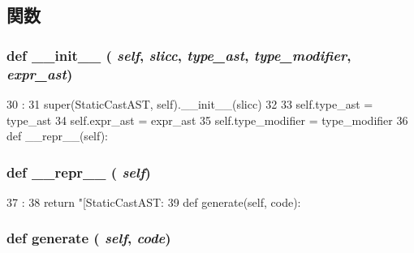 \subsection{関数}
\hypertarget{classslicc_1_1ast_1_1StaticCastAST_1_1StaticCastAST_ac775ee34451fdfa742b318538164070e}{
\subsubsection[{\_\-\_\-init\_\-\_\-}]{\setlength{\rightskip}{0pt plus 5cm}def \_\-\_\-init\_\-\_\- ( {\em self}, \/   {\em slicc}, \/   {\em type\_\-ast}, \/   {\em type\_\-modifier}, \/   {\em expr\_\-ast})}}
\label{classslicc_1_1ast_1_1StaticCastAST_1_1StaticCastAST_ac775ee34451fdfa742b318538164070e}



\begin{DoxyCode}
30                                                                 :
31         super(StaticCastAST, self).__init__(slicc)
32 
33         self.type_ast = type_ast
34         self.expr_ast = expr_ast
35         self.type_modifier = type_modifier
36 
    def __repr__(self):
\end{DoxyCode}
\hypertarget{classslicc_1_1ast_1_1StaticCastAST_1_1StaticCastAST_ad8b9328939df072e4740cd9a63189744}{
\subsubsection[{\_\-\_\-repr\_\-\_\-}]{\setlength{\rightskip}{0pt plus 5cm}def \_\-\_\-repr\_\-\_\- ( {\em self})}}
\label{classslicc_1_1ast_1_1StaticCastAST_1_1StaticCastAST_ad8b9328939df072e4740cd9a63189744}



\begin{DoxyCode}
37                       :
38         return "[StaticCastAST: %
39 
    def generate(self, code):
\end{DoxyCode}
\hypertarget{classslicc_1_1ast_1_1StaticCastAST_1_1StaticCastAST_a4555d1cee0dccf3942ea35fe86de2e8e}{
\subsubsection[{generate}]{\setlength{\rightskip}{0pt plus 5cm}def generate ( {\em self}, \/   {\em code})}}
\label{classslicc_1_1ast_1_1StaticCastAST_1_1StaticCastAST_a4555d1cee0dccf3942ea35fe86de2e8e}



